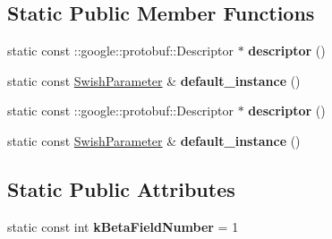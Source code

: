 \subsection*{Static Public Member Functions}
\begin{DoxyCompactItemize}
\item 
\mbox{\label{classcaffe_1_1_swish_parameter_a802fba44c35173b4651db5dcbf57f474}} 
static const \+::google\+::protobuf\+::\+Descriptor $\ast$ {\bfseries descriptor} ()
\item 
\mbox{\label{classcaffe_1_1_swish_parameter_a325b6cd284a6984af9dded9fda407663}} 
static const \mbox{\hyperlink{classcaffe_1_1_swish_parameter}{Swish\+Parameter}} \& {\bfseries default\+\_\+instance} ()
\item 
\mbox{\label{classcaffe_1_1_swish_parameter_a77ef1197b9771ea37724e9cab7fd8614}} 
static const \+::google\+::protobuf\+::\+Descriptor $\ast$ {\bfseries descriptor} ()
\item 
\mbox{\label{classcaffe_1_1_swish_parameter_a94c9994bd79d62a662a9a740d9f2fcde}} 
static const \mbox{\hyperlink{classcaffe_1_1_swish_parameter}{Swish\+Parameter}} \& {\bfseries default\+\_\+instance} ()
\end{DoxyCompactItemize}
\subsection*{Static Public Attributes}
\begin{DoxyCompactItemize}
\item 
\mbox{\label{classcaffe_1_1_swish_parameter_a01489bed06f2f97b2749bd231ecb58ef}} 
static const int {\bfseries k\+Beta\+Field\+Number} = 1
\end{DoxyCompactItemize}
